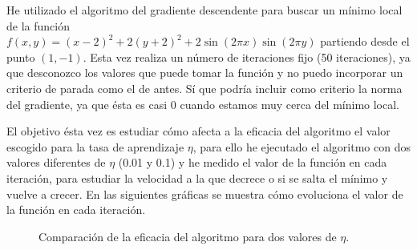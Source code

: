 \documentclass[a4]{article}
\begin{document}
He utilizado el algoritmo del gradiente descendente para buscar un mínimo local de la función \\
$f(x,y)=(x-2)^2+2(y+2)^2+2\sin(2\pi x)\sin(2\pi y)$ partiendo desde el punto $(1,-1)$. Esta vez
realiza un número de iteraciones fijo (50 iteraciones), ya que desconozco los valores que puede
tomar la función y no puedo incorporar un criterio de parada como el de antes. Sí que podría incluir
como criterio la norma del gradiente, ya que ésta es casi 0 cuando estamos muy cerca del mínimo local.

El objetivo ésta vez es estudiar cómo afecta a la eficacia del algoritmo el valor escogido para la
tasa de aprendizaje $\eta$, para ello he ejecutado el algoritmo con dos valores diferentes de $\eta$
(0.01 y 0.1) y he medido el valor de la función en cada iteración, para estudiar la velocidad a la que
decrece o si se salta el mínimo y vuelve a crecer. En las siguientes gráficas se muestra cómo evoluciona
el valor de la función en cada iteración.

\begin{figure}[H]
    \centering    
    \caption{Comparación de la eficacia del algoritmo para dos valores de $\eta$.}
    \label{fig:comp-eta}
\end{figure}
\end{document}
